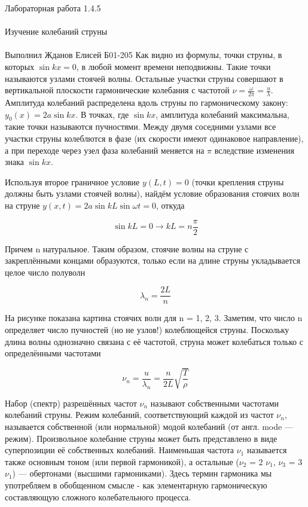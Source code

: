 \documentclass{astroedu-lab}
\begin{document}
\begin{problem}{\huge Лабораторная работа 1.4.5\\\\Изучение колебаний струны\\\\Выполнил Жданов Елисей Б01-205}
Как видно из формулы, точки струны, в которых $\sin{k x} = 0$, в любой момент времени неподвижны. Такие точки называются узлами стоячей волны. Остальные участки струны совершают в вертикальной плоскости гармонические колебания с частотой $\nu = \frac{\omega}{2 \pi} = \frac{u}{\lambda}$. Амплитуда колебаний распределена вдоль струны по гармоническому закону: $y_0(x) = 2 a \sin{k x}$. В точках,
где $\sin{k x}$, амплитуда колебаний максимальна, такие точки называются пучностями. Между двумя соседними узлами все участки струны колеблются в фазе (их скорости имеют одинаковое направление), а при переходе через узел фаза колебаний меняется на $\pi$ вследствие изменения знака $\sin{k x}$.

Используя второе граничное условие $y(L, t) = 0$ (точки крепления струны должны быть узлами стоячей волны), найдём условие образования стоячих волн на струне $y(x, t) = 2 a \sin{k L} \sin{\omega t} = 0$, откуда

\begin{equation}
	\sin{k L} = 0 \rightarrow k L = n \frac{\pi}{2}
\end{equation}

Причем n натуральное. Таким образом, стоячие волны на струне с закреплёнными концами образуются, только если на длине струны укладывается целое число полуволн

\begin{equation}
	\boxed{\lambda_n = \frac{2 L}{n}}
\end{equation}

На рисунке показана картина стоячих волн для n = 1, 2, 3. Заметим, что число n определяет число пучностей (но не узлов!) колеблющейся струны. Поскольку длина волны однозначно связана с её частотой, струна может колебаться только с определёнными частотами

\begin{equation}
	\nu_n = \frac{u}{\lambda_n} = \frac{n}{2 L} \sqrt{\frac{T}{\rho}}
\end{equation}

Набор (спектр) разрешённых частот $\nu_n$ называют собственными частотами колебаний струны. Режим колебаний, соответствующий каждой из частот $\nu_n$, называется собственной (или нормальной) модой колебаний (от англ. mode — режим). Произвольное колебание струны может быть представлено в виде суперпозиции её собственных колебаний. Наименьшая частота $\nu_1$ называется также основным тоном (или первой гармоникой), а остальные ($\nu_2$ = 2 $\nu_1$, $\nu_3$ = 3 $\nu_1$) — обертонами (высшими гармониками). Здесь термин гармоника мы употребляем в обобщенном смысле - как элементарную гармоническую составляющую сложного колебательного процесса.


\end{problem}
\end{document}
